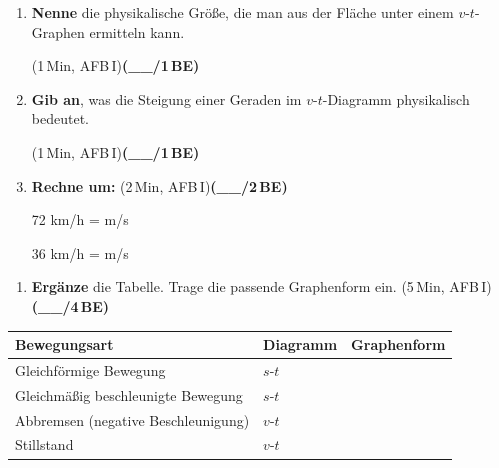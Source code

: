 \documentclass[11pt,a4paper]{article}
\newcommand{\BEZEIT}[3]{%
\hfill{\small\color{zeitgray}(#1\,Min, AFB\,#2)}\quad\textbf{(\_\_/#3\,BE)}%
}
\begin{document}

\noindent{}

\vspace{0.4cm}

\begin{enumerate}
\item[a)] \textbf{Nenne} die physikalische Größe, die man aus der Fläche unter einem $v$-$t$-Graphen ermitteln kann.

\hfill{\small\color{zeitgray}(1\,Min, AFB\,I)}\quad\textbf{(\_\_/1\,BE)}

\vspace{1.2cm}

\item[b)] \textbf{Gib an}, was die Steigung einer Geraden im $v$-$t$-Diagramm physikalisch bedeutet.

\hfill{\small\color{zeitgray}(1\,Min, AFB\,I)}\quad\textbf{(\_\_/1\,BE)}

\vspace{1.2cm}

\item[c)] \textbf{Rechne um:} \BEZEIT{2}{I}{2}

\vspace{0.3cm}
\hspace{1cm} 72 km/h = \underline{\hspace{3cm}} m/s

\vspace{0.5cm}
\hspace{1cm} 36 km/h = \underline{\hspace{3cm}} m/s

\end{enumerate}

\newpage

\begin{enumerate}
\item[d)] \textbf{Ergänze} die Tabelle. Trage die passende Graphenform ein. \BEZEIT{5}{I}{4}
\end{enumerate}

\vspace{0.5cm}

\begin{center}
\begin{tabular}{|p{6cm}|p{3cm}|p{5cm}|}
\hline
\textbf{Bewegungsart} & \textbf{Diagramm} & \textbf{Graphenform} \\
\hline
Gleichförmige Bewegung & $s$-$t$ & \\[0.8cm]
\hline
Gleichmäßig beschleunigte Bewegung & $s$-$t$ & \\[0.8cm]
\hline
Abbremsen (negative Beschleunigung) & $v$-$t$ & \\[0.8cm]
\hline
Stillstand & $v$-$t$ & \\[0.8cm]
\hline
\end{tabular}
\end{center}
\end{document}
